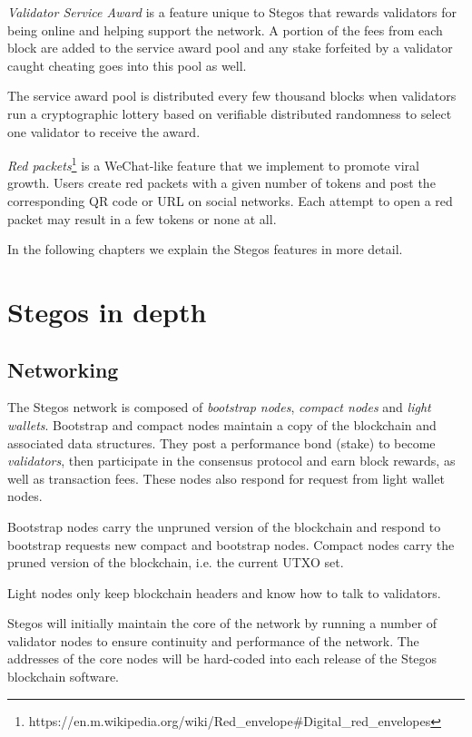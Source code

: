 \documentclass[8pt,fleqn,openany]{book}
\begin{document}
\textit{Validator Service Award} is a feature unique to Stegos that rewards validators for being online and helping support the network. A portion of the fees from each block are added to the service award pool and any stake forfeited by a validator caught cheating goes into this pool as well. 

The service award pool is distributed every few thousand blocks when validators run a cryptographic lottery based on verifiable distributed randomness to select one validator to receive the award.

\textit{Red packets}\footnote{https://en.m.wikipedia.org/wiki/Red\_envelope\#Digital\_red\_envelopes} is a WeChat-like feature that we implement to promote viral growth. Users create red packets with a given number of tokens and post the corresponding QR code or URL on social networks. Each attempt to open a red packet may result in a few tokens or none at all. 

In the following chapters we explain the Stegos features in more detail.

\chapter{Stegos in depth}\label{chap:stegos-in-depth}

\section{Networking}

The Stegos network is composed of \textit{bootstrap nodes}, \textit{compact nodes} and \textit{light wallets}. Bootstrap and compact nodes maintain a copy of the blockchain and associated data structures. They post a performance bond (stake) to become \textit{validators}, then participate in the consensus protocol and earn block rewards, as well as transaction fees. These nodes also respond for request from light wallet nodes.

Bootstrap nodes carry the unpruned version of the blockchain and respond to bootstrap requests new compact and bootstrap nodes. Compact nodes carry the pruned version of the blockchain, i.e. the current UTXO set.

Light nodes only keep blockchain headers and know how to talk to validators. 

Stegos will initially maintain the core of the network by running a number of validator nodes to ensure continuity and performance of the network. The addresses of the core nodes will be hard-coded into each release of the Stegos blockchain software.
\end{document}
